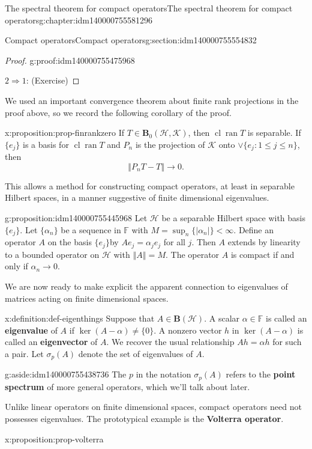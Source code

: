 \documentclass[oneside,10pt,]{book}
\newcommand{\terminology}[1]{\textbf{#1}}
\numberwithin{equation}{section}
\DeclareMathOperator{\cl}{cl}
\newcommand{\hilbert}{\mathcal{H}}
\newcommand{\K}{\mathcal{K}}
\newcommand{\BOP}{\mathbf{B}}
\newcommand{\BH}{\mathbf{B}(\mathcal{H})}
\newcommand{\abs}[1]{\left\vert#1\right\vert}
\newcommand{\norm}[1]{\left\Vert#1\right\Vert}
\newcommand{\ran}[1]{\operatorname{ran}#1}
\numberwithin{equation}{section}
\newcommand{\lt}{<}
\begin{document}
\begin{chapterptx}{The spectral theorem for compact operators}{}{The spectral theorem for compact operators}{}{}{g:chapter:idm140000755581296}
\begin{sectionptx}{Compact operators}{}{Compact operators}{}{}{g:section:idm140000755554832}
\begin{proof}{}{g:proof:idm140000755475968}
\par
\(2 \Rightarrow 1\): (Exercise)%
\end{proof}
We used an important convergence theorem about finite rank projections in the proof above, so we record the following corollary of the proof.%
\begin{proposition}{}{}{x:proposition:prop-finrankzero}%
If \(T \in \BOP_0(\hilbert, \K)\), then \(\cl \ran T\) is separable. If \(\{e_j\}\) is a basis for \(\cl \ran T\) and \(P_n\) is the projection of \(\K\) onto \(\vee\{e_j:1 \leq j\leq n\}\), then%
\begin{equation*}
\norm{P_n T - T} \to 0.
\end{equation*}
%
\end{proposition}
This allows a method for constructing compact operators, at least in separable Hilbert spaces, in a manner suggestive of finite dimensional eigenvalues.%
\begin{proposition}{}{}{g:proposition:idm140000755445968}%
Let \(\hilbert\) be a separable Hilbert space with basis \(\{e_j\}\). Let \(\{\alpha_n\}\) be a sequence in \(\mathbb{F}\) with \(M = \sup_n\{\abs{\alpha_n}\} \lt \infty\). Define an operator \(A\) on the basis \(\{e_j\}\)by \(A e_j = \alpha_j e_j\) for all \(j\). Then \(A\) extends by linearity to a bounded operator on \(\hilbert\) with \(\norm{A} = M\). The operator \(A\) is compact if and only if \(\alpha_n \to 0\).%
\end{proposition}
We are now ready to make explicit the apparent connection to eigenvalues of matrices acting on finite dimensional spaces.%
\begin{definition}{}{x:definition:def-eigenthings}%
Suppose that \(A \in \BH\). A scalar \(\alpha \in \mathbb{F}\) is called an \terminology{eigenvalue} of \(A\) if \(\ker(A - \alpha) \neq \{0\}\). A nonzero vector \(h\) in \(\ker(A - \alpha)\) is called an \terminology{eigenvector} of \(A\). We recover the usual relationship \(Ah = \alpha h\) for such a pair. Let \(\sigma_p(A)\) denote the set of eigenvalues of \(A\).%
\end{definition}
\begin{aside}{}{g:aside:idm140000755438736}%
The \(p\) in the notation \(\sigma_p(A)\) refers to the \terminology{point spectrum} of more general operators, which we'll talk about later.%
\end{aside}
Unlike linear operators on finite dimensional spaces, compact operators need not possesses eigenvalues. The prototypical example is the \terminology{Volterra operator}.%
\begin{proposition}{}{}{x:proposition:prop-volterra}%

\end{proposition}
\end{sectionptx}
\end{chapterptx}
\end{document}
